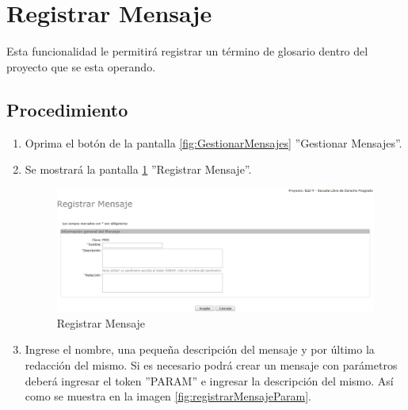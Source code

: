 \hypertarget{cv:registrarMensaje}{\section{Registrar Mensaje}} \label{sec:registrarMensaje}

	Esta funcionalidad le permitirá registrar un término de glosario dentro del proyecto que se esta operando. 

		\subsection{Procedimiento}

			\begin{enumerate}
	
			\item Oprima el botón \IURegistrar{} de la pantalla \ref{fig:GestionarMensajes} ''Gestionar Mensajes''.
			
			\item Se mostrará la pantalla \ref{fig:registrarMensaje} ''Registrar Mensaje''.

			\begin{figure}[H]
				\begin{center}
					\includegraphics[scale=0.5]{roles/lider/mensajes/pantallas/IU9-1registrarMensaje}
					\caption{Registrar Mensaje}
					\label{fig:registrarMensaje}
				\end{center}
			\end{figure}
		
			\item Ingrese el nombre, una pequeña descripción del mensaje y por último la redacción del mismo. Si es necesario podrá crear un mensaje con parámetros deberá ingresar el token ''PARAM'' e ingresar la descripción del mismo. Así como se muestra en la imagen \ref{fig:registrarMensajeParam}.
			

\end{enumerate}
